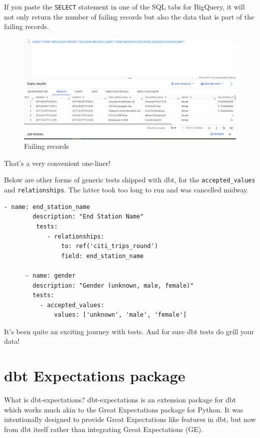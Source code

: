 \documentclass[
]{book}
\begin{document}
If you paste the \texttt{SELECT} statement in one of the SQL tabs for BigQuery, it will not only return the number of failing records but also the data that is part of the failing records.

\begin{figure}
\centering
\includegraphics{./images/failing_records.png}
\caption{Failing records}
\end{figure}

That's a very convenient one-liner!

Below are other forms of generic tests shipped with dbt, for the \texttt{accepted\_values} and \texttt{relationships}. The latter took too long to run and was cancelled midway.

\begin{verbatim}
- name: end_station_name
        description: "End Station Name"
         tests:
            - relationships:
                to: ref('citi_trips_round')
                field: end_station_name

      - name: gender
        description: "Gender (unknown, male, female)"
        tests:
          - accepted_values:
              values: ['unknown', 'male', 'female']
\end{verbatim}

It's been quite an exciting journey with tests. And for sure dbt tests do grill your data!

\hypertarget{dbt-expectations-package}{%
\chapter{dbt Expectations package}\label{dbt-expectations-package}}

What is dbt-expectations? dbt-expectations is an extension package for dbt which works much akin to the Great Expectations package for Python. It was intentionally designed to provide Great Expectations like features in dbt, but now from dbt itself rather than integrating Great Expectations (GE).
\end{document}
